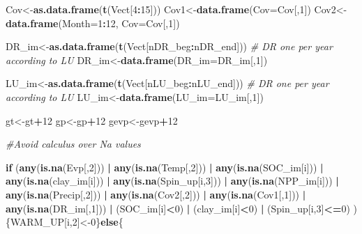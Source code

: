\documentclass[
  10pt,
  b5paper,
]{book}
\newenvironment{Shaded}{\begin{snugshade}}{\end{snugshade}}
\newcommand{\CommentTok}[1]{\textcolor[rgb]{0.56,0.35,0.01}{\textit{#1}}}
\newcommand{\ControlFlowTok}[1]{\textcolor[rgb]{0.13,0.29,0.53}{\textbf{#1}}}
\newcommand{\DataTypeTok}[1]{\textcolor[rgb]{0.13,0.29,0.53}{#1}}
\newcommand{\DecValTok}[1]{\textcolor[rgb]{0.00,0.00,0.81}{#1}}
\newcommand{\KeywordTok}[1]{\textcolor[rgb]{0.13,0.29,0.53}{\textbf{#1}}}
\newcommand{\NormalTok}[1]{#1}
\newcommand{\OperatorTok}[1]{\textcolor[rgb]{0.81,0.36,0.00}{\textbf{#1}}}
\newcommand{\StringTok}[1]{\textcolor[rgb]{0.31,0.60,0.02}{#1}}
\begin{document}
\begin{Shaded}
\begin{Highlighting}[]
\NormalTok{Cov<-}\KeywordTok{as.data.frame}\NormalTok{(}\KeywordTok{t}\NormalTok{(Vect[}\DecValTok{4}\OperatorTok{:}\DecValTok{15}\NormalTok{]))}
\NormalTok{Cov1<-}\KeywordTok{data.frame}\NormalTok{(}\DataTypeTok{Cov=}\NormalTok{Cov[,}\DecValTok{1}\NormalTok{])}
\NormalTok{Cov2<-}\KeywordTok{data.frame}\NormalTok{(}\DataTypeTok{Month=}\DecValTok{1}\OperatorTok{:}\DecValTok{12}\NormalTok{, }\DataTypeTok{Cov=}\NormalTok{Cov[,}\DecValTok{1}\NormalTok{])}

\NormalTok{DR_im<-}\KeywordTok{as.data.frame}\NormalTok{(}\KeywordTok{t}\NormalTok{(Vect[nDR_beg}\OperatorTok{:}\NormalTok{nDR_end])) }\CommentTok{# DR one per year according to LU}
\NormalTok{DR_im<-}\KeywordTok{data.frame}\NormalTok{(}\DataTypeTok{DR_im=}\NormalTok{DR_im[,}\DecValTok{1}\NormalTok{])}

\NormalTok{LU_im<-}\KeywordTok{as.data.frame}\NormalTok{(}\KeywordTok{t}\NormalTok{(Vect[nLU_beg}\OperatorTok{:}\NormalTok{nLU_end])) }\CommentTok{# DR one per year according to LU}
\NormalTok{LU_im<-}\KeywordTok{data.frame}\NormalTok{(}\DataTypeTok{LU_im=}\NormalTok{LU_im[,}\DecValTok{1}\NormalTok{])}

\NormalTok{gt<-gt}\OperatorTok{+}\DecValTok{12}
\NormalTok{gp<-gp}\OperatorTok{+}\DecValTok{12}
\NormalTok{gevp<-gevp}\OperatorTok{+}\DecValTok{12}

\CommentTok{#Avoid calculus over Na values }

\ControlFlowTok{if}\NormalTok{ (}\KeywordTok{any}\NormalTok{(}\KeywordTok{is.na}\NormalTok{(Evp[,}\DecValTok{2}\NormalTok{])) }\OperatorTok{|}\StringTok{ }\KeywordTok{any}\NormalTok{(}\KeywordTok{is.na}\NormalTok{(Temp[,}\DecValTok{2}\NormalTok{])) }\OperatorTok{|}\StringTok{ }\KeywordTok{any}\NormalTok{(}\KeywordTok{is.na}\NormalTok{(SOC_im[i])) }\OperatorTok{|}\StringTok{ }\KeywordTok{any}\NormalTok{(}\KeywordTok{is.na}\NormalTok{(clay_im[i])) }\OperatorTok{|}\StringTok{ }\KeywordTok{any}\NormalTok{(}\KeywordTok{is.na}\NormalTok{(Spin_up[i,}\DecValTok{3}\NormalTok{]))  }\OperatorTok{|}\StringTok{ }\KeywordTok{any}\NormalTok{(}\KeywordTok{is.na}\NormalTok{(NPP_im[i])) }\OperatorTok{|}\StringTok{ }\KeywordTok{any}\NormalTok{(}\KeywordTok{is.na}\NormalTok{(Precip[,}\DecValTok{2}\NormalTok{]))  }\OperatorTok{|}\StringTok{  }\KeywordTok{any}\NormalTok{(}\KeywordTok{is.na}\NormalTok{(Cov2[,}\DecValTok{2}\NormalTok{]))  }\OperatorTok{|}\StringTok{  }\KeywordTok{any}\NormalTok{(}\KeywordTok{is.na}\NormalTok{(Cov1[,}\DecValTok{1}\NormalTok{]))  }\OperatorTok{|}\StringTok{ }\KeywordTok{any}\NormalTok{(}\KeywordTok{is.na}\NormalTok{(DR_im[,}\DecValTok{1}\NormalTok{]))    }\OperatorTok{|}\StringTok{  }\NormalTok{(SOC_im[i]}\OperatorTok{<}\DecValTok{0}\NormalTok{) }\OperatorTok{|}\StringTok{ }\NormalTok{(clay_im[i]}\OperatorTok{<}\DecValTok{0}\NormalTok{) }\OperatorTok{|}\StringTok{ }\NormalTok{(Spin_up[i,}\DecValTok{3}\NormalTok{]}\OperatorTok{<=}\DecValTok{0}\NormalTok{) ) \{WARM_UP[i,}\DecValTok{2}\NormalTok{]<-}\DecValTok{0}\NormalTok{\}}\ControlFlowTok{else}\NormalTok{\{}


\end{Highlighting}
\end{Shaded}
\end{document}
